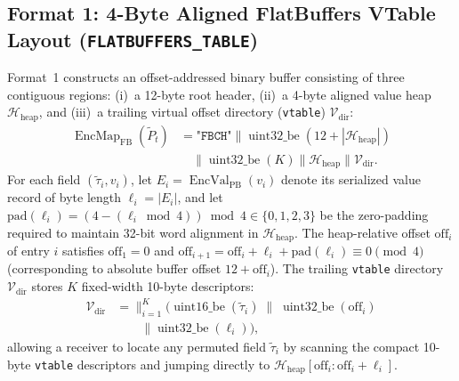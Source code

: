 \documentclass[conference,10pt]{IEEEtran}
\begin{document}
\subsection{Format 1: 4-Byte Aligned FlatBuffers VTable Layout (\texttt{FLATBUFFERS\_TABLE})}
Format~1 constructs an offset-addressed binary buffer consisting of three contiguous regions: (i)~a 12-byte root header, (ii)~a 4-byte aligned value heap $\mathcal{H}_{\text{heap}}$, and (iii)~a trailing virtual offset directory (\texttt{vtable}) $\mathcal{V}_{\text{dir}}$:
\begin{equation}
\label{eq:fb_layout}
\begin{aligned}
\operatorname{EncMap}_{\text{FB}}(\tilde{P}_t) &= \texttt{"FBCH"} \parallel \operatorname{uint32\_be}(12 + |\mathcal{H}_{\text{heap}}|) \\
&\quad \parallel \operatorname{uint32\_be}(K) \parallel \mathcal{H}_{\text{heap}} \parallel \mathcal{V}_{\text{dir}}.
\end{aligned}
\end{equation}
For each field $(\tilde{\tau}_i, v_i)$, let $E_i = \operatorname{EncVal}_{\text{PB}}(v_i)$ denote its serialized value record of byte length $\ell_i = |E_i|$, and let $\text{pad}(\ell_i) = (4 - (\ell_i \bmod 4)) \bmod 4 \in \{0, 1, 2, 3\}$ be the zero-padding required to maintain 32-bit word alignment in $\mathcal{H}_{\text{heap}}$. The heap-relative offset $\text{off}_i$ of entry $i$ satisfies $\text{off}_1 = 0$ and $\text{off}_{i+1} = \text{off}_i + \ell_i + \text{pad}(\ell_i) \equiv 0 \pmod 4$ (corresponding to absolute buffer offset $12 + \text{off}_i$). The trailing \texttt{vtable} directory $\mathcal{V}_{\text{dir}}$ stores $K$ fixed-width 10-byte descriptors:
\begin{equation}
\label{eq:fb_vtable}
\begin{aligned}
\mathcal{V}_{\text{dir}} &= \big\|_{i=1}^K \Big( \operatorname{uint16\_be}(\tilde{\tau}_i) \;\parallel\; \operatorname{uint32\_be}(\text{off}_i) \\
&\qquad \parallel \operatorname{uint32\_be}(\ell_i) \Big),
\end{aligned}
\end{equation}
allowing a receiver to locate any permuted field $\tilde{\tau}_i$ by scanning the compact 10-byte \texttt{vtable} descriptors and jumping directly to $\mathcal{H}_{\text{heap}}[\text{off}_i : \text{off}_i + \ell_i]$.
\end{document}
